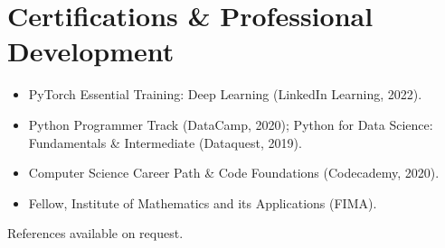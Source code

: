 \documentclass[10pt,a4paper]{article}
\begin{document}
\section{Certifications \& Professional Development}
\begin{itemize}[leftmargin=1.3em,itemsep=1.5pt,topsep=2pt]
  \item PyTorch Essential Training: Deep Learning (LinkedIn Learning, 2022).
  \item Python Programmer Track (DataCamp, 2020); Python for Data Science: Fundamentals \& Intermediate (Dataquest, 2019).
  \item Computer Science Career Path \& Code Foundations (Codecademy, 2020).
  \item Fellow, Institute of Mathematics and its Applications (FIMA).
\end{itemize}

\vspace{4pt}
{\small\color{muted} References available on request.}
\end{document}
